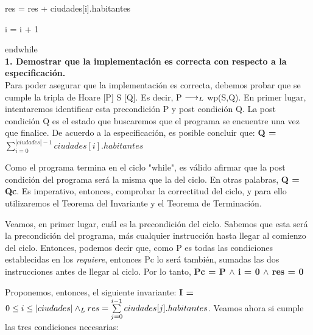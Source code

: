 \documentclass[10pt,a4paper]{article}
\begin{document}
    \hspace{0.7cm}res = res + ciudades[i].habitantes
    
    \hspace{0.7cm}i = i + 1
    
    endwhile\\

\newpage
\textbf{1. Demostrar que la implementación es correcta con respecto a la especificación.}\\

Para poder asegurar que la implementación es correcta, debemos probar que se cumple la tripla de Hoare [P] S [Q]. Es decir, P $\longrightarrow _L$ wp(S,Q). En primer lugar, intentaremos identificar esta precondición P y post condición Q.
La post condición Q es el estado que buscaremos que el programa se encuentre una vez que finalice. De acuerdo a la especificación, es posible concluir que:
\textbf{{Q = ${\sum\limits_{i=0}^{|ciudades| - 1}ciudades[i].habitantes}$}}

Como el programa termina en el ciclo "while", es válido afirmar que la post condición del programa será la misma que la del ciclo. En otras palabras, \textbf{Q = Qc}. Es imperativo, entonces, comprobar la correctitud del ciclo, y para ello utilizaremos el Teorema del Invariante y el Teorema de Terminación.

Veamos, en primer lugar, cuál es la precondición del ciclo. Sabemos que esta será la precondición del programa, más cualquier instrucción hasta llegar al comienzo del ciclo. Entonces, podemos decir que, como P es todas las condiciones establecidas en los \textit{requiere}, entonces Pc lo será también, sumadas las dos instrucciones antes de llegar al ciclo. Por lo tanto, \textbf{Pc = P $\wedge$ i = 0 $\wedge$ res = 0}

Proponemos, entonces, el siguiente invariante: \textbf{I = $0 \leq i \leq |ciudades| \land _L res = \sum\limits_{j=0}^{i - 1}ciudades[j].habitantes$}. Veamos ahora si cumple las tres condiciones necesarias: 
\end{document}
